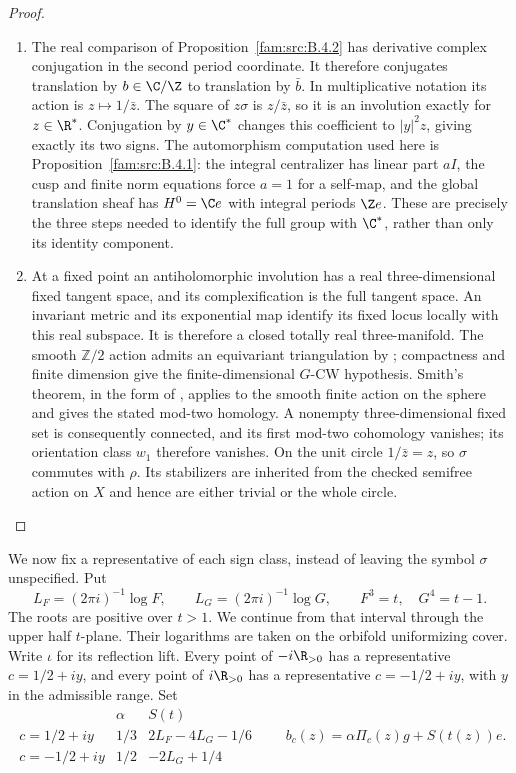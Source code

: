 \begin{proof}
\begin{enumerate}[label=\arabic*.,leftmargin=*]
\item The real comparison of Proposition~\ref{fam:src:B.4.2} has derivative complex conjugation in the
second period coordinate. It therefore conjugates translation by
$b\in\C/\Z$ to translation by $\bar b$. In multiplicative notation its
action is $z\mapsto1/\bar z$. The square of $z\sigma$ is $z/\bar z$,
so it is an involution exactly for $z\in\R^*$. Conjugation by $y\in\C^*$
changes this coefficient to $|y|^2z$, giving exactly its two signs.
The automorphism computation used here is Proposition~\ref{fam:src:B.4.1}: the integral centralizer has linear part $aI$, the cusp and
finite norm equations force $a=1$ for a self-map, and the global
translation sheaf has $H^0=\C e$ with integral periods $\Z e$.
These are precisely the three steps needed to identify the full group
with $\C^*$, rather than only its identity component.

\item At a fixed point an antiholomorphic involution has a real three-dimensional
fixed tangent space, and its complexification is the full tangent space.
An invariant metric and its exponential map identify its fixed locus
locally with this real subspace. It is therefore a closed totally real
three-manifold. The smooth $\mathbb Z/2$ action admits an equivariant
triangulation by \cite[Theorem~3.1, p.~48]{Illman1972}; compactness and finite
dimension give the finite-dimensional $G$-CW hypothesis. Smith's theorem,
in the form of
\cite[Theorem 4.1(1)]{Knudson2004}, applies to the smooth finite action on
the sphere and gives the stated mod-two homology. A nonempty
three-dimensional fixed set is consequently connected, and its first
mod-two cohomology vanishes; its orientation class $w_1$ therefore
vanishes. On the unit circle $1/\bar z=z$, so $\sigma$ commutes with
$\rho$. Its stabilizers are inherited from the checked semifree action
on $X$ and hence are either trivial or the whole circle.
\end{enumerate}
\end{proof}

We now fix a representative of each sign class, instead of leaving the
symbol $\sigma$ unspecified. Put
\[
 L_F=(2\pi i)^{-1}\log F,\qquad L_G=(2\pi i)^{-1}\log G,
 \qquad F^3=t,\quad G^4=t-1.
 \label{mapsI:real-eq-1}
\]
The roots are positive over $t>1$. We continue from that interval
through the upper half $t$-plane. Their logarithms are taken on the
orbifold uniformizing cover. Write $\iota$ for its reflection lift.
Every point of $-i\R_{>0}$ has a representative $c=1/2+iy$, and every
point of $i\R_{>0}$ has a representative $c=-1/2+iy$, with $y$ in the
admissible range. Set
\[
\begin{array}{c|c|c}
 &\alpha&S(t)\\\hline
 c=1/2+iy&1/3&2L_F-4L_G-1/6\\
 c=-1/2+iy&1/2&-2L_G+1/4
\end{array}
\qquad b_c(z)=\alpha\Pi_c(z)g+S(t(z))e.
\label{mapsI:real-eq-2}
\]

